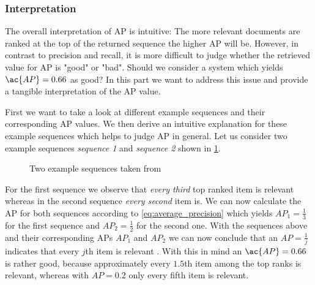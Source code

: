 \subsubsection{Interpretation}
\label{chp:fundamentals:sec:metrics:subsec:average_precision:interpretation}
The overall interpretation of \ac{AP} is intuitive: The more relevant documents are ranked at the top of the returned sequence the higher \ac{AP} will be.
However, in contrast to precision and recall, it is more difficult to judge whether the retrieved value for \ac{AP} is "good" or "bad".
Should we consider a system which yields $\ac{AP}=0.66$ as good?
In this part we want to address this issue and provide a tangible interpretation of the \ac{AP} value.

First we want to take a look at different example sequences and their corresponding \ac{AP} values.
We then derive an intuitive explanation for these example sequences which helps to judge \ac{AP} in general.
Let us consider two example sequences \textit{sequence 1} and \textit{sequence 2} shown in \cref{fig:metrics:average_precision:interpreation:sample}.

\begin{figure}[htpb]
    \centering
    \def\svgwidth{\columnwidth}
    
    \caption[Two Example Sequences]{Two example sequences taken from \textcite{Tapaswi:2012}}\label{fig:metrics:average_precision:interpreation:sample}
\end{figure}

For the first sequence we observe that \textit{every third} top ranked item is relevant whereas in the second sequence \textit{every second} item is.
We can now calculate the \ac{AP} for both sequences according to \cref{eq:average_precision} which yields $AP_1= \frac{1}{3}$ for the first sequence and $AP_2= \frac{1}{2}$ for the second one.
With the sequences above and their corresponding \acp{AP} $AP_1$ and $AP_2$ we can now conclude that an $AP=\frac{1}{j}$ indicates that every $j$th item is relevant \parencite{Tapaswi:2012}.
With this in mind an $\ac{AP}=0.66$ is rather good, because approximately every $1.5$th item among the top ranks is relevant, whereas with $AP=0.2$ only every fifth item is relevant.
